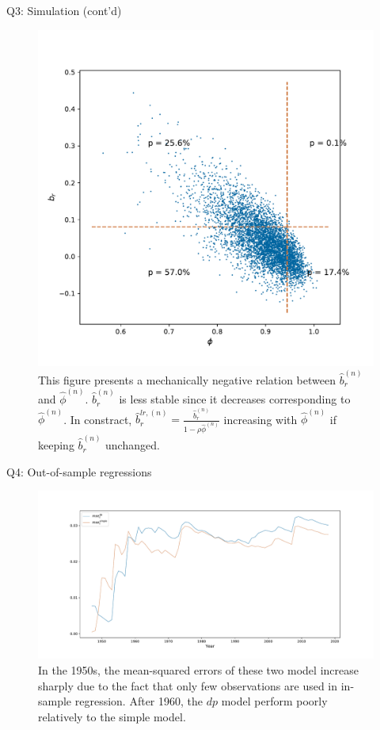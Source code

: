 \documentclass[10pt,t]{beamer}
\begin{document}
\begin{frame}{Q3: Simulation (cont'd)}
\begin{figure}[h!]
\centering
\includegraphics[width=0.5\linewidth]{q3fig1.pdf}
\caption{This figure presents a mechanically negative relation between $\hat{b}_r^{(n)}$ and $\hat{\phi}^{(n)}$. $\hat{b}_r^{(n)}$ is less stable since it decreases corresponding to $\hat{\phi}^{(n)}$. In constract, $\hat{b}_r^{lr, (n)} = \frac{\hat{b}_r^{(n)}}{1 - \rho\hat{\phi}^{(n)}}$ increasing with $\hat{\phi}^{(n)}$ if keeping $\hat{b}_r^{(n)}$ unchanged.}
\end{figure}
\end{frame}




\begin{frame}{Q4: Out-of-sample regressions}
\begin{figure}[h!]
\centering
\includegraphics[width=\linewidth]{q4fig1.pdf}
\caption{In the 1950s, the mean-squared errors of these two model increase sharply due to the fact that only few observations are used in in-sample regression. After 1960, the $dp$ model perform poorly relatively to the simple model.}
\end{figure}
\end{frame}
\end{document}
